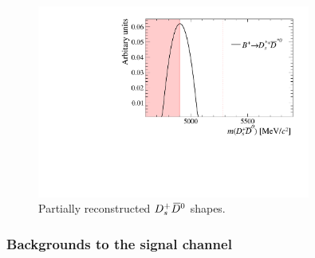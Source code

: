 \begin{figure}[!h]
    \centering
    \includegraphics[width=0.80\textwidth]{figs/B2DsPhi/DsstarDstar0_part_reco_Shapes.pdf}
    \caption{Partially reconstructed ${{D}^+_{s}}{{\kern 0.2em\overline{\kern -0.2em D}{}}{}^0}$ shapes.}
    \label{fig:B2DsPhi_DsstarDstar0_partreco}   
\end{figure}



\subsubsection{Backgrounds to the signal channel}




